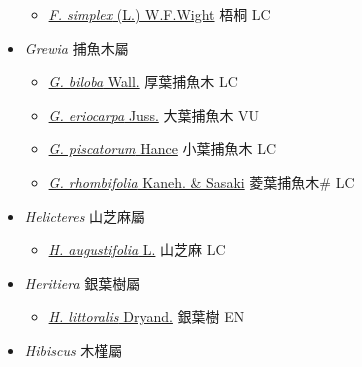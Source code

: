 \begin{itemize}
  \begin{itemize}
        \item[] \href{http://www.theplantlist.org/tpl1.1/search?q=Firmiana+simplex}{\textit{F. simplex} (L.) W.F.Wight}   梧桐 LC
  \end{itemize}
 \item[] \textit{Grewia} 捕魚木屬
                    
  \begin{itemize}
        \item[] \href{http://www.theplantlist.org/tpl1.1/search?q=Grewia+biloba}{\textit{G. biloba} Wall.}   厚葉捕魚木 LC
        \item[] \href{http://www.theplantlist.org/tpl1.1/search?q=Grewia+eriocarpa}{\textit{G. eriocarpa} Juss.}   大葉捕魚木 VU
        \item[] \href{http://www.theplantlist.org/tpl1.1/search?q=Grewia+piscatorum}{\textit{G. piscatorum} Hance}   小葉捕魚木 LC
        \item[] \href{http://www.theplantlist.org/tpl1.1/search?q=Grewia+rhombifolia}{\textit{G. rhombifolia} Kaneh. \& Sasaki}   菱葉捕魚木\# LC
  \end{itemize}
 \item[] \textit{Helicteres} 山芝麻屬
                    
  \begin{itemize}
        \item[] \href{http://www.theplantlist.org/tpl1.1/search?q=Helicteres+augustifolia}{\textit{H. augustifolia} L.}   山芝麻 LC
  \end{itemize}
 \item[] \textit{Heritiera} 銀葉樹屬
                    
  \begin{itemize}
        \item[] \href{http://www.theplantlist.org/tpl1.1/search?q=Heritiera+littoralis}{\textit{H. littoralis} Dryand.}   銀葉樹 EN
  \end{itemize}
 \item[] \textit{Hibiscus} 木槿屬
                    

\end{itemize}
